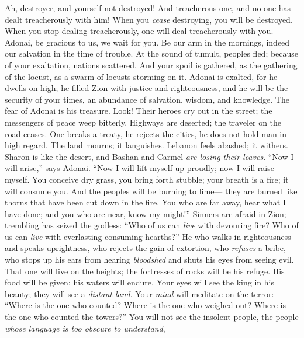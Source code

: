 \begin{biblechapter} %
 Ah, destroyer, and yourself not destroyed! 
And treacherous one, and no one has dealt treacherously with him! 
When you \textit{cease} destroying, you will be destroyed. 
When you stop dealing treacherously, one will deal treacherously with you.
\verse Adonai, be gracious to us, we wait for you. 
Be our arm in the mornings, 
indeed our salvation in the time of trouble.
\verse At the sound of tumult, peoples fled; 
because of your exaltation, nations scattered.
\verse And your spoil is gathered, 
as the gathering of the locust, 
as a swarm of locusts storming on it.
\verse Adonai is exalted, for he dwells on high; 
he filled Zion with justice and righteousness,
\verse and he will be the security of your times, 
an abundance of salvation, wisdom, and knowledge. The fear of Adonai is his treasure.
\verse Look! Their heroes cry out in the street; 
the messengers of peace weep bitterly.
\verse Highways are deserted; 
the traveler on the road ceases. 
One breaks a treaty, 
he rejects the cities, 
he does not hold man in high regard.
\verse The land mourns; it languishes. 
Lebanon feels abashed; it withers. 
Sharon is like the desert, 
and Bashan and Carmel \textit{are losing their leaves}.
\verse “Now I will arise,” says Adonai. 
“Now I will lift myself up proudly; 
now I will raise myself.
\verse You conceive dry grass, you bring forth stubble; 
your breath is a fire; it will consume you.
\verse And the peoples will be burning to lime— 
they are burned like thorns that have been cut down in the fire.
\verse You who are far away, hear what I have done; 
and you who are near, know my might!”
\verse Sinners are afraid in Zion; 
trembling has seized the godless: 
“Who of us can \textit{live} with devouring fire? 
Who of us can \textit{live} with everlasting consuming hearths?”
\verse He who walks in righteousness 
and speaks uprightness, 
who rejects the gain of extortion, 
who \textit{refuses} a bribe, 
who stops up his ears from hearing \textit{bloodshed} 
and shuts his eyes from seeing evil.
\verse That one will live on the heights; 
the fortresses of rocks will be his refuge. 
His food will be given; 
his waters will endure.
\verse Your eyes will see the king in his beauty; 
they will see a \textit{distant land}.
\verse Your \textit{mind} will meditate on the terror: 
“Where is the one who counted? 
Where is the one who weighed out? 
Where is the one who counted the towers?”
\verse You will not see the insolent people, 
the people \textit{whose language is too obscure to understand}, 

\end{biblechapter}
